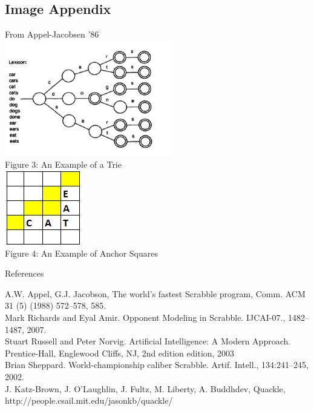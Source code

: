 \documentclass[12pt]{article}
\begin{document}
\clearpage
\begin{center}
\section*{Image Appendix}

From Appel-Jacobsen '86\\
\includegraphics[scale=0.6]{../images/trie}\\
Figure 3: An Example of a Trie \\
\includegraphics{../images/anchorexample}\\
Figure 4: An Example of Anchor Squares

\vspace{ 8cm }
{\Large References} 
\end{center}
A.W. Appel, G.J. Jacobson, The world’s fastest Scrabble program, Comm. ACM 31 (5) (1988) 572–578, 585. \\
Mark Richards and Eyal Amir. Opponent Modeling in Scrabble. IJCAI-07., 1482–1487, 2007. \\
Stuart Russell and Peter Norvig. Artificial Intelligence: A Modern Approach. Prentice-Hall,
Englewood Cliffs, NJ, 2nd edition edition, 2003 \\
Brian Sheppard. World-championship caliber Scrabble. Artif. Intell., 134:241–245, 2002. \\
J. Katz-Brown, J. O'Laughlin, J. Fultz, M. Liberty, A. Buddhdev, Quackle, http://people.csail.mit.edu/jasonkb/quackle/
\end{document}
